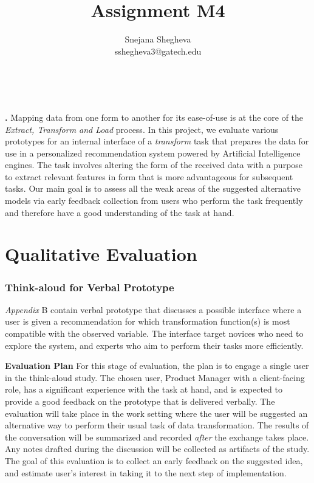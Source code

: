 \documentclass[12pt,letterpaper]{article}
\makeatletter
\renewcommand{\maketitle}{\bgroup
   \begin{center}
   \textbf{{\fontsize{18pt}{20}\selectfont \@title}}\\
   \vspace{10pt}
   {\fontsize{12pt}{0}\selectfont \@author} 
   \end{center}
}
\newenvironment{myquote}[1]%
  {\list{}{\leftmargin=#1\rightmargin=#1}\item[]}%
  {\endlist}
\renewenvironment{abstract}
{\vspace*{-.5in}\fontsize{12pt}{12}\begin{myquote}{.5in}
\noindent \par{\bfseries \abstractname.}}
{\medskip\noindent
\end{myquote}
}
\makeatother
\begin{document}
\title{Assignment M4}
\author{Snejana Shegheva \\ sshegheva3@gatech.edu}

\maketitle
\thispagestyle{fancy}

\begin{abstract}
Mapping data from one form to another for its ease-of-use is at the core of the \textit{Extract, Transform and Load} process. In this project, we evaluate various prototypes for an internal interface of a \textit{transform} task that prepares the data for use in a personalized recommendation system powered by Artificial Intelligence engines. The task involves altering the form of the received data with a purpose to extract relevant features in form that is more advantageous for subsequent tasks. Our main goal is to assess all the weak areas of the suggested alternative models via early feedback collection from users who perform the task frequently and therefore have a good understanding of the task at hand.  
\end{abstract}

\section*{Qualitative Evaluation}
\subsubsection*{Think-aloud for Verbal Prototype}
\textit{Appendix} B contain verbal prototype that discusses a possible interface where a user is given a recommendation for which transformation function(s) is most compatible with the observed variable. The interface target novices who need to explore the system, and experts who aim to perform their tasks more efficiently.

\textbf{Evaluation Plan}
For this stage of evaluation, the plan is to engage a single user in the think-aloud study. The chosen user, Product Manager with a client-facing role, has a significant experience with the task at hand, and is expected to provide a good feedback on the prototype that is delivered verbally. The evaluation will take place in the work setting where the user will be suggested an alternative way to perform their usual task of data transformation. The results of the conversation will be summarized and recorded \textit{after} the exchange takes place. Any notes drafted during the discussion will be collected as artifacts of the study. The goal of this evaluation is to collect an early feedback on the suggested idea, and estimate user's interest in taking it to the next step of implementation.
\end{document}
